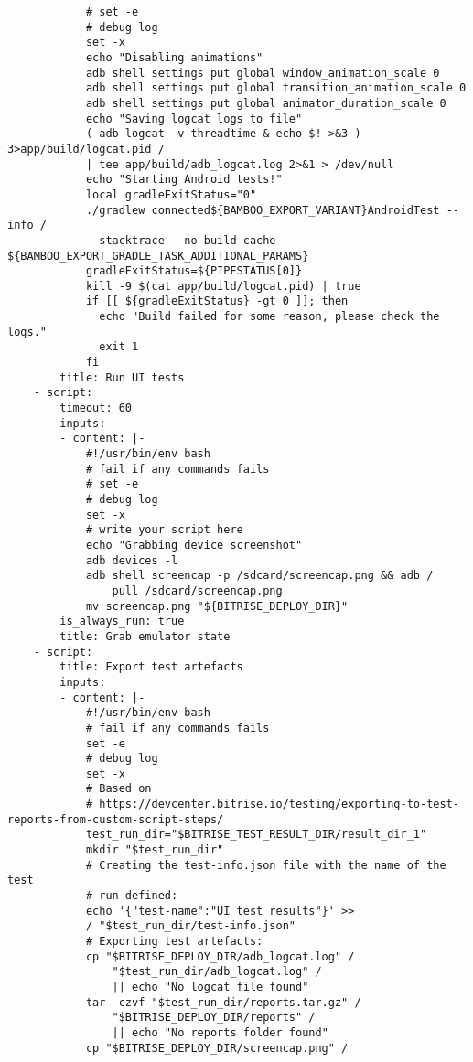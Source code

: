 \begin{verbatim}
            # set -e
            # debug log
            set -x
            echo "Disabling animations"
            adb shell settings put global window_animation_scale 0
            adb shell settings put global transition_animation_scale 0
            adb shell settings put global animator_duration_scale 0
            echo "Saving logcat logs to file"
            ( adb logcat -v threadtime & echo $! >&3 ) 3>app/build/logcat.pid /
            | tee app/build/adb_logcat.log 2>&1 > /dev/null
            echo "Starting Android tests!"
            local gradleExitStatus="0"
            ./gradlew connected${BAMBOO_EXPORT_VARIANT}AndroidTest --info / 
            --stacktrace --no-build-cache ${BAMBOO_EXPORT_GRADLE_TASK_ADDITIONAL_PARAMS}
            gradleExitStatus=${PIPESTATUS[0]}
            kill -9 $(cat app/build/logcat.pid) | true
            if [[ ${gradleExitStatus} -gt 0 ]]; then
              echo "Build failed for some reason, please check the logs."
              exit 1
            fi
        title: Run UI tests
    - script:
        timeout: 60
        inputs:
        - content: |-
            #!/usr/bin/env bash
            # fail if any commands fails
            # set -e
            # debug log
            set -x
            # write your script here
            echo "Grabbing device screenshot"
            adb devices -l
            adb shell screencap -p /sdcard/screencap.png && adb / 
                pull /sdcard/screencap.png
            mv screencap.png "${BITRISE_DEPLOY_DIR}"
        is_always_run: true
        title: Grab emulator state
    - script:
        title: Export test artefacts
        inputs:
        - content: |-
            #!/usr/bin/env bash
            # fail if any commands fails
            set -e
            # debug log
            set -x
            # Based on 
            # https://devcenter.bitrise.io/testing/exporting-to-test-reports-from-custom-script-steps/
            test_run_dir="$BITRISE_TEST_RESULT_DIR/result_dir_1"
            mkdir "$test_run_dir"
            # Creating the test-info.json file with the name of the test 
            # run defined:
            echo '{"test-name":"UI test results"}' >> 
            / "$test_run_dir/test-info.json"
            # Exporting test artefacts:
            cp "$BITRISE_DEPLOY_DIR/adb_logcat.log" /
                "$test_run_dir/adb_logcat.log" /
                || echo "No logcat file found"
            tar -czvf "$test_run_dir/reports.tar.gz" /
                "$BITRISE_DEPLOY_DIR/reports" /
                || echo "No reports folder found"
            cp "$BITRISE_DEPLOY_DIR/screencap.png" /

\end{verbatim}
